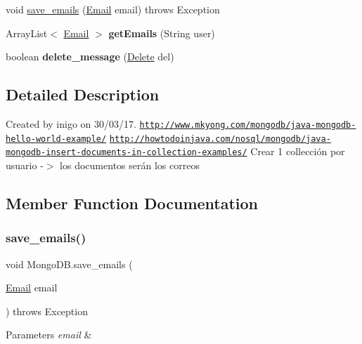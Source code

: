 \begin{DoxyCompactItemize}
\item 
void \hyperlink{class_mongo_d_b_a2e376b333a71c82b5dd8e054d538e7f4}{save\+\_\+emails} (\hyperlink{class_email}{Email} email)  throws Exception 
\item 
\mbox{\label{class_mongo_d_b_afb31e6d36e9b20ceff3f13901bfc4012}} 
Array\+List$<$ \hyperlink{class_email}{Email} $>$ {\bfseries get\+Emails} (String user)
\item 
\mbox{\label{class_mongo_d_b_a1bc531a4e919dd942edeafc749e30f81}} 
boolean {\bfseries delete\+\_\+message} (\hyperlink{class_delete}{Delete} del)
\end{DoxyCompactItemize}


\subsection{Detailed Description}
Created by inigo on 30/03/17. \href{http://www.mkyong.com/mongodb/java-mongodb-hello-world-example/}{\tt http\+://www.\+mkyong.\+com/mongodb/java-\/mongodb-\/hello-\/world-\/example/} \href{http://howtodoinjava.com/nosql/mongodb/java-mongodb-insert-documents-in-collection-examples/}{\tt http\+://howtodoinjava.\+com/nosql/mongodb/java-\/mongodb-\/insert-\/documents-\/in-\/collection-\/examples/} Crear 1 collección por usuario -\/$>$ los documentos serán los correos 

\subsection{Member Function Documentation}
\mbox{\label{class_mongo_d_b_a2e376b333a71c82b5dd8e054d538e7f4}} 
\subsubsection{\texorpdfstring{save\+\_\+emails()}{save\_emails()}}
{\footnotesize\ttfamily void Mongo\+D\+B.\+save\+\_\+emails (\begin{DoxyParamCaption}\item[{\hyperlink{class_email}{Email}}]{email }\end{DoxyParamCaption}) throws Exception}


\begin{DoxyParams}{Parameters}
{\em email} & \\
\hline
\end{DoxyParams}


